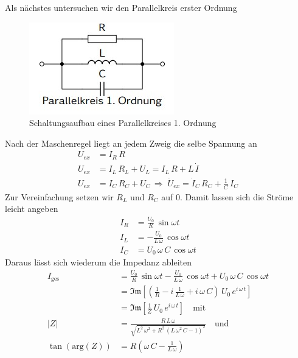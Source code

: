 \documentclass[a4paper, 12pt,]{scrartcl}
\begin{document}
Als nächstes untersuchen wir den Parallelkreis erster Ordnung
\begin{figure}[H]\centering\includegraphics[scale=1]{PK 1}\caption{Schaltungsaufbau eines Parallelkreises 1. Ordnung}\end{figure}
Nach der Maschenregel liegt an jedem Zweig die selbe Spannung an
\begin{align*}U_{ex}&=I_R\,R\\
U_{ex}&=I_L\,R_L+U_L=I_L\,R+L\,\dot{I}\\
U_{ex}&=I_C\,R_C+U_C\,\Rightarrow\;\dot{U}_{ex}=\dot{I}_C\,R_C+\frac{1}{C}\,I_C\end{align*}
Zur Vereinfachung setzen wir $R_L$ und $R_C$ auf 0. Damit lassen sich die Ströme leicht angeben
\begin{align*}I_R&=\frac{U_0}{R}\,\sin\omega{t}\\
I_L&=-\frac{U_0}{L\,\omega}\,\cos\omega{t}\\
I_C&=U_0\,\omega\,C\,\cos\omega{t}\end{align*}
Daraus lässt sich wiederum die Impedanz ableiten
\begin{align*}I_\text{ges}&=\frac{U_0}{R}\,\sin\omega{t}-\frac{U_0}{L\,\omega}\,\cos\omega{t}+U_0\,\omega\,C\,\cos\omega{t}\\
&=\mathfrak{Im}\left[\left(\frac{1}{R}-i\,\frac{1}{L\,\omega}+i\,\omega\,C\right)\,U_0\,e^{i\,\omega\,t}\right]\\
&=\mathfrak{Im}\left[\frac{1}{Z}\,U_0\,e^{i\,\omega\,t}\right]\quad\text{mit}\\
|Z|&=\frac{R\,L\,\omega}{\sqrt{L^2\,\omega^2+R^2\,(L\,\omega^2\,C-1)^2}}\quad\text{und}\\
\tan(\text{arg}(Z))&=R(\omega\,C-\frac{1}{L\,\omega})\end{align*}
\end{document}
